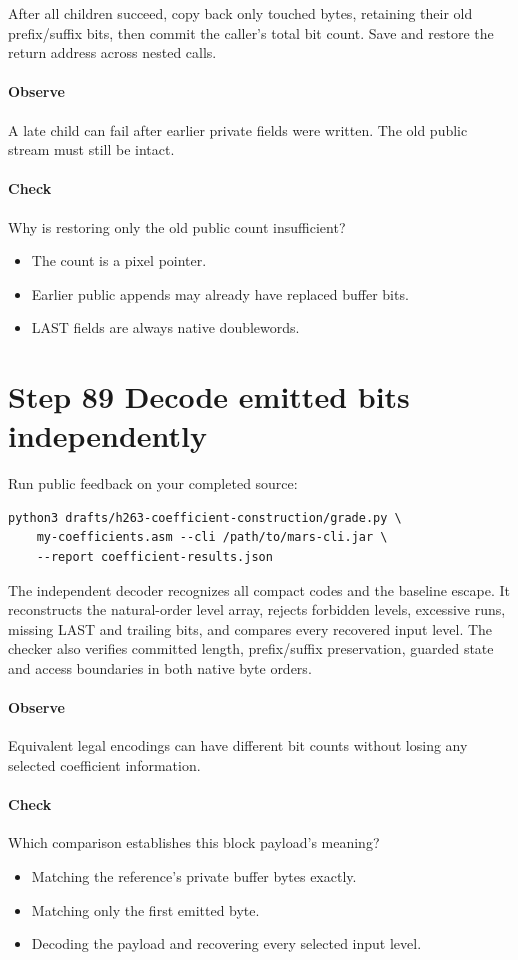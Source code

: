After all children succeed, copy back only touched bytes, retaining their old
prefix/suffix bits, then commit the caller's total bit count. Save and restore
the return address across nested calls.

\paragraph{Observe} A late child can fail after earlier private fields were written.
The old public stream must still be intact.
\paragraph{Check} Why is restoring only the old public count insufficient?
\begin{itemize}
  \item[A.] The count is a pixel pointer.
  \item[B.] Earlier public appends may already have replaced buffer bits.
  \item[C.] LAST fields are always native doublewords.
\end{itemize}

\section{Step 89 Decode emitted bits independently}\label{h263-coeff-s09}
Run public feedback on your completed source:
\begin{verbatim}
python3 drafts/h263-coefficient-construction/grade.py \
    my-coefficients.asm --cli /path/to/mars-cli.jar \
    --report coefficient-results.json
\end{verbatim}
The independent decoder recognizes all compact codes and the baseline escape.
It reconstructs the natural-order level array, rejects forbidden levels, excessive
runs, missing LAST and trailing bits, and compares every recovered input level.
The checker also verifies committed length, prefix/suffix preservation, guarded
state and access boundaries in both native byte orders.

\paragraph{Observe} Equivalent legal encodings can have different bit counts
without losing any selected coefficient information.
\Needspace{8\baselineskip}
\paragraph{Check} Which comparison establishes this block payload's meaning?
\begin{itemize}
  \item[A.] Matching the reference's private buffer bytes exactly.
  \item[B.] Matching only the first emitted byte.
  \item[C.] Decoding the payload and recovering every selected input level.
\end{itemize}

